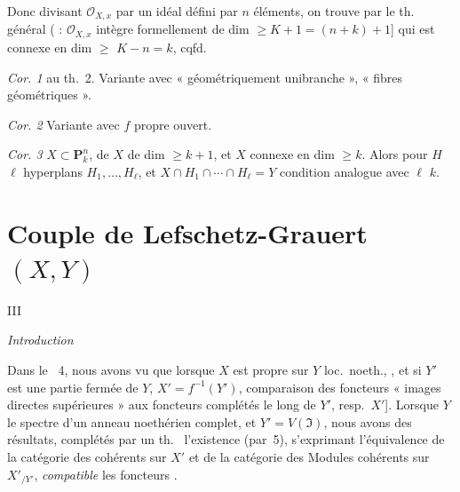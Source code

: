 \documentclass[11pt,a4paper]{article}
\begin{document}
Donc divisant $\mathcal{O}_{X,x}$ par un idéal défini par $n$ éléments, on \struck{\ill{}} trouve par le th. général \struck{\ill{}} ( : $\mathcal{O}_{X,x}$ intègre formellement \ill{} de dim $\geq K+1 = (n+k)+1$] \ill{} \ill{} qui est connexe en dim $\geq$  $K - n = k$, cqfd.

\emph{Cor. 1} au th.~2. Variante avec \struck{\ill{}} « géométriquement \struck{\ill{}} unibranche », « \struck{\ill{}} fibres géométriques ».

\emph{Cor. 2} Variante avec $f$ propre  ouvert.

\emph{Cor. 3} $X \subset \mathbf{P}^n_k$,   de $X$ de dim $\geq k+1$, et $X$ connexe en dim $\geq k$. Alors pour $H$  \ill{} $\ell$ hyperplans $H_1, \ldots, H_\ell$, et $X \cap H_1 \cap \cdots \cap H_\ell = Y$ \ill{} condition analogue avec $\ell$ \ill{} $k$.

\section{Couple de Lefschetz-Grauert $(X, Y)$}

III \ill{}

\emph{Introduction}

Dans le ~4, nous avons vu que lorsque $X$ est propre sur $Y$ loc.\ noeth., , \struck{\ill{} \ill{} \ill{}} et si $Y'$ est une partie fermée de $Y$, $X' = f^{-1}(Y')$, \ill{} \add{\ill{} \ill{}} comparaison des foncteurs  « images directes supérieures » aux foncteurs complétés le long de $Y'$, resp.\ $X'$]. Lorsque $Y$  le spectre d'un anneau \struck{\ill{}} noethérien  complet, et $Y' = V(\mathfrak{I})$, nous avons des résultats, complétés par un th.\  l'existence (par~5), s'exprimant   \struck{\ill{}} l'équivalence de la catégorie des \struck{\ill{}}  cohérents sur $X'$ et de la catégorie des Modules cohérents sur $X'_{/Y'}$, \emph{compatible}  les foncteurs \ill{} \ill{} .
\end{document}
